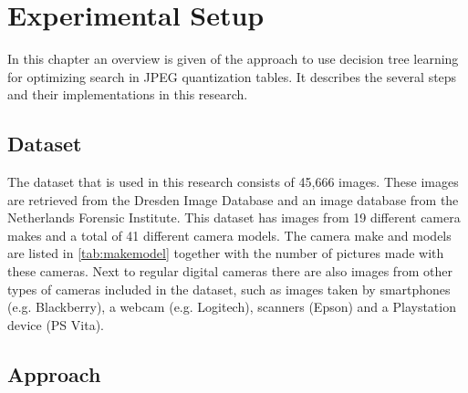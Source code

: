 \chapter{Experimental Setup} %
\label{ch:impl} %
In this chapter an overview is given of the approach to use decision tree learning for optimizing search in JPEG quantization tables. It describes the several steps and their implementations in this research. 

\section{Dataset}
The dataset that is used in this research consists of 45,666 images. These images are retrieved from the Dresden Image Database \cite{Gloe:2010aa} and an image database from the Netherlands Forensic Institute. This dataset has images from 19 different camera makes and a total of 41 different camera models. The camera make and models are listed in \autoref{tab:makemodel} together with the number of pictures made with these cameras. Next to regular digital cameras there are also images from other types of cameras included in the dataset, such as images taken by smartphones (e.g. Blackberry), a webcam (e.g. Logitech), scanners (Epson) and a Playstation device (PS Vita). 

\section{Approach}


